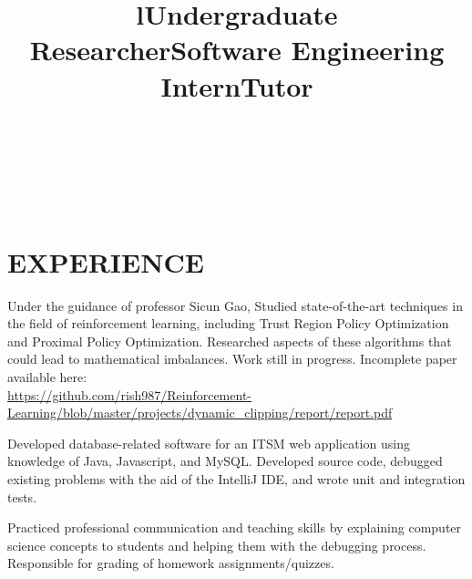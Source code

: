 \documentclass[margin]{res}
\begin{document}
\begin{resume}
\begin{format}
\title{l}\\
\\
\body\\
\end{format}

\section{EXPERIENCE}
\title{\textbf{Undergraduate Researcher}}
\begin{position}
Under the guidance of professor Sicun Gao, Studied state-of-the-art techniques
in the field of reinforcement learning, including Trust Region Policy
Optimization and Proximal Policy Optimization.  Researched aspects of these
algorithms that could lead to mathematical imbalances. Work still in progress.
Incomplete paper available here:\\
    \url{https://github.com/rish987/Reinforcement-Learning/blob/master/projects/dynamic_clipping/report/report.pdf}
\end{position}

\title{\textbf{Software Engineering Intern}}
\begin{position}
Developed database-related software for an ITSM web application using knowledge
of Java, Javascript, and MySQL.  Developed source code, debugged existing
problems with the aid of the IntelliJ IDE, and wrote unit and integration
tests.
\end{position}

\title{\textbf{Tutor}}
\begin{position}
Practiced professional communication and teaching skills by explaining computer
science concepts to students and helping them with the debugging process.
Responsible for grading of homework assignments/quizzes.
\end{position}
\end{resume}
\end{document}
